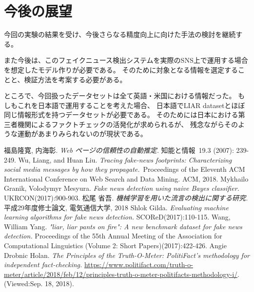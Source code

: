 \documentclass[twocolumn, a4paper, uplatex]{UECIEresume}
\begin{document}
\section{今後の展望}
今回の実験の結果を受け、今後さらなる精度向上に向けた手法の検討を継続する。

また今後は、このフェイクニュース検出システムを実際のSNS上で運用する場合を想定したモデル作りが必要である。
そのために対象となる情報を選定することと、検証方法を考案する必要がある。

ところで、今回扱ったデータセットは全て英語・米国における情報だった。
もしもこれを日本語で運用することを考えた場合、
日本語でLIAR datasetとほぼ同じ情報形式を持つデータセットが必要である。
そのためには日本における第三者機関によるファクトチェックの活発化が求められるが、
残念ながらそのような運動があまりみられないのが現状である。

{\small
\begin{thebibliography}{*}
  福島隆寛, 内海彰. \textit{Web ページの信頼性の自動推定.} 知能と情報 19.3 (2007): 239-249.
  Wu, Liang, and Huan Liu. \textit{Tracing fake-news footprints: Characterizing social media messages by how they propagate.} Proceedings of the Eleventh ACM International Conference on Web Search and Data Mining. ACM, 2018.
  Mykhailo Granik, Volodymyr Mesyura. \textit{Fake news detection using naive Bayes classifier.} UKRCON(2017):900-903.
  松尾 省吾. \textit{機械学習を用いた流言の検出に関する研究.} 平成29年度修士論文, 電気通信大学, 2018
  Shlok Gilda. \textit{Evaluating machine learning algorithms for fake news detection.} SCOReD(2017):110-115.
  Wang, William Yang. \textit{"liar, liar pants on fire": A new benchmark dataset for fake news detection.} Proceedings of the 55th Annual Meeting of the Association for Computational Linguistics (Volume 2: Short Papers)(2017):422-426.
  Angie Drobnic Holan. \textit{The Principles of the Truth-O-Meter: PolitiFact’s methodology for independent fact-checking.} \url{https://www.politifact.com/truth-o-meter/article/2018/feb/12/principles-truth-o-meter-politifacts-methodology-i/}. (Viewed:Sep. 18, 2018).
\end{thebibliography}
}
\end{document}
